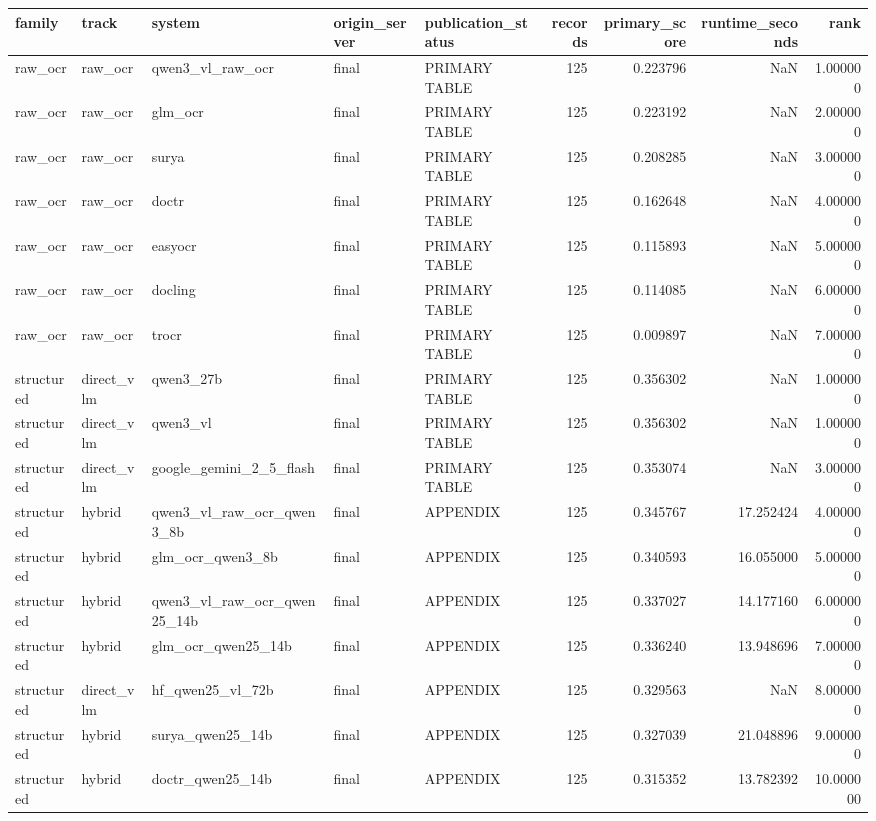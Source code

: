 \begin{tabular}{lllllrrrr}
\toprule
family & track & system & origin\_server & publication\_status & records & primary\_score & runtime\_seconds & rank \\
\midrule
raw\_ocr & raw\_ocr & qwen3\_vl\_raw\_ocr & final & PRIMARY TABLE & 125 & 0.223796 & NaN & 1.000000 \\
raw\_ocr & raw\_ocr & glm\_ocr & final & PRIMARY TABLE & 125 & 0.223192 & NaN & 2.000000 \\
raw\_ocr & raw\_ocr & surya & final & PRIMARY TABLE & 125 & 0.208285 & NaN & 3.000000 \\
raw\_ocr & raw\_ocr & doctr & final & PRIMARY TABLE & 125 & 0.162648 & NaN & 4.000000 \\
raw\_ocr & raw\_ocr & easyocr & final & PRIMARY TABLE & 125 & 0.115893 & NaN & 5.000000 \\
raw\_ocr & raw\_ocr & docling & final & PRIMARY TABLE & 125 & 0.114085 & NaN & 6.000000 \\
raw\_ocr & raw\_ocr & trocr & final & PRIMARY TABLE & 125 & 0.009897 & NaN & 7.000000 \\
structured & direct\_vlm & qwen3\_27b & final & PRIMARY TABLE & 125 & 0.356302 & NaN & 1.000000 \\
structured & direct\_vlm & qwen3\_vl & final & PRIMARY TABLE & 125 & 0.356302 & NaN & 1.000000 \\
structured & direct\_vlm & google\_gemini\_2\_5\_flash & final & PRIMARY TABLE & 125 & 0.353074 & NaN & 3.000000 \\
structured & hybrid & qwen3\_vl\_raw\_ocr\_qwen3\_8b & final & APPENDIX & 125 & 0.345767 & 17.252424 & 4.000000 \\
structured & hybrid & glm\_ocr\_qwen3\_8b & final & APPENDIX & 125 & 0.340593 & 16.055000 & 5.000000 \\
structured & hybrid & qwen3\_vl\_raw\_ocr\_qwen25\_14b & final & APPENDIX & 125 & 0.337027 & 14.177160 & 6.000000 \\
structured & hybrid & glm\_ocr\_qwen25\_14b & final & APPENDIX & 125 & 0.336240 & 13.948696 & 7.000000 \\
structured & direct\_vlm & hf\_qwen25\_vl\_72b & final & APPENDIX & 125 & 0.329563 & NaN & 8.000000 \\
structured & hybrid & surya\_qwen25\_14b & final & APPENDIX & 125 & 0.327039 & 21.048896 & 9.000000 \\
structured & hybrid & doctr\_qwen25\_14b & final & APPENDIX & 125 & 0.315352 & 13.782392 & 10.000000 \\

\end{tabular}
